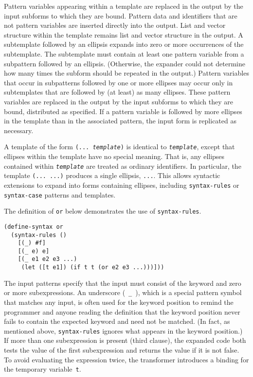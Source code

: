 Pattern variables appearing within a template are replaced in
the output by the input subforms to which they are bound.
Pattern data and identifiers that are not pattern variables
are inserted directly into the output.
List and vector structure within the template remains list and vector
structure in the output.
A subtemplate followed by an ellipsis expands
into zero or more occurrences of the subtemplate.
The subtemplate
must contain at least one pattern variable from a subpattern
followed by an ellipsis.
(Otherwise, the expander could not determine how many times the subform
should be repeated in the output.)
Pattern variables that occur in subpatterns followed by one or more
ellipses may occur only in subtemplates that are
followed by (at least) as many ellipses.
These pattern variables are replaced in the output by the input
subforms to which  they are bound, distributed as specified.
If a pattern variable is followed by more ellipses in the template
than in the associated pattern, the input form is replicated as
necessary.


A template of the form
\texttt{(... \textit{template})} is identical to \texttt{\textit{template}}, except that
ellipses within the template have no special meaning.
That is, any ellipses contained within \texttt{\textit{template}} are
treated as ordinary identifiers.
In particular, the template \texttt{(... ...)} produces a single
ellipsis, \texttt{...}.
This allows syntactic extensions to expand into forms containing
ellipses, including \texttt{syntax-rules} or \texttt{syntax-case}
patterns and templates.


The definition of \texttt{or} below demonstrates the use of
\texttt{syntax-rules}.


\begin{alltt}
(define-syntax or
  (syntax-rules ()
    [(\_{}) \#{}f]
    [(\_{} e) e]
    [(\_{} e1 e2 e3 ...)
     (let ([t e1]) (if t t (or e2 e3 ...)))]))
\end{alltt}


The input patterns specify that the input must consist of the
keyword and zero or more subexpressions.
An \label{syntax_s24}\label{syntax_s25}underscore ( \texttt{\_{}} ),
which is a special pattern symbol that matches any input,
is often used for the keyword position to remind the programmer
and anyone reading the definition that the keyword
position never fails to contain the expected keyword and need not be
matched.
(In fact, as mentioned above, \texttt{syntax-rules} ignores what appears
in the keyword position.)
If more than one subexpression is present (third clause), the
expanded code both tests the value of the first subexpression
and returns the value if it is not false.
To avoid evaluating the expression twice, the transformer
introduces a binding for the temporary variable \texttt{t}.


